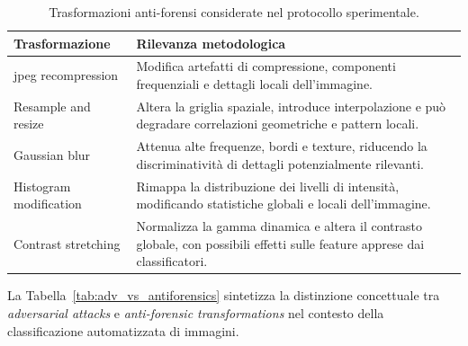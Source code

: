 \begin{table}[htbp]
    \centering
    \small
    \renewcommand{\arraystretch}{1.25}
    \begin{tabularx}{\textwidth}{@{}lX@{}}
        \toprule
        \textbf{Trasformazione} & \textbf{Rilevanza metodologica} \\
        \midrule
        \gls{jpeg} recompression &
        Modifica artefatti di compressione, componenti frequenziali e dettagli
        locali dell'immagine. \\
        Resample and resize &
        Altera la griglia spaziale, introduce interpolazione e può degradare
        correlazioni geometriche e pattern locali. \\
        Gaussian blur &
        Attenua alte frequenze, bordi e texture, riducendo la discriminatività
        di dettagli potenzialmente rilevanti. \\
        Histogram modification &
        Rimappa la distribuzione dei livelli di intensità, modificando
        statistiche globali e locali dell'immagine. \\
        Contrast stretching &
        Normalizza la gamma dinamica e altera il contrasto globale, con possibili
        effetti sulle feature apprese dai classificatori. \\
        \bottomrule
    \end{tabularx}
    \caption{Trasformazioni anti-forensi considerate nel protocollo sperimentale.}
    \label{tab:background_antiforensic_transformations}
\end{table}




La Tabella~\ref{tab:adv_vs_antiforensics} sintetizza la distinzione concettuale tra \textit{adversarial attacks} e \textit{anti-forensic transformations} nel contesto della classificazione automatizzata di immagini.


